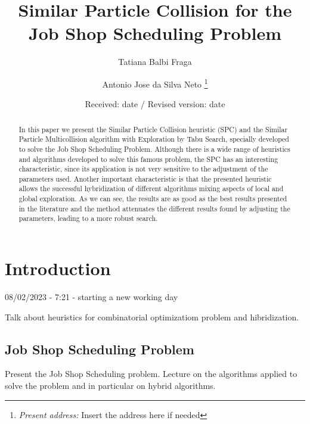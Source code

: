 %
\title{Similar Particle Collision for the Job Shop Scheduling Problem}
\author{Tatiana Balbi Fraga \and Antonio Jose da Silva Neto%
\thanks{\emph{Present address:} Insert the address here if needed}%
}                     %
%
\offprints{}          %
%
%
\date{Received: date / Revised version: date}
%
\maketitle
%
\begin{abstract}
In this paper we present the Similar Particle Collision heuristic (SPC) and the Similar Particle Multicollision algorithm with Exploration by Tabu Search, specially developed to solve the Job Shop Scheduling Problem. Although there is a wide range of heuristics and algorithms developed to solve this famous problem, the SPC has an interesting characteristic, since its application is not very sensitive to the adjustment of the parameters used. Another important characteristic is that the presented heuristic allows the successful hybridization of different algorithms mixing aspects of local and global exploration. As we can see, the results are as good as the best results presented in the literature and the method attenuates the different results found by adjusting the parameters, leading to a more robust search.
\end{abstract}
%
\section{Introduction}
\label{intro}

08/02/2023 - 7:21 - starting a new working day

Talk about heuristics for combinatorial optimizatiom problem and hibridization.

\subsection{Job Shop Scheduling Problem}
\label{sec:JSSP}

Present the Job Shop Scheduling problem. 
Lecture on the algorithms applied to solve the problem and in particular on hybrid algorithms.


